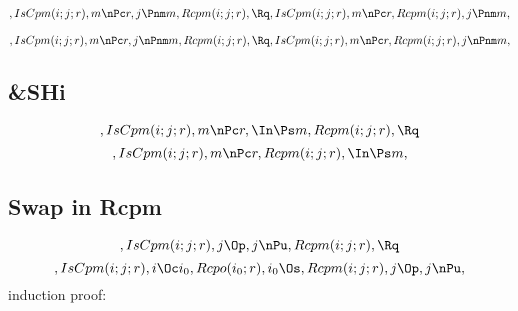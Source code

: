 \[, IsCpm(i;j;r), m \nPc r, j \Pnm m, Rcpm(i;j;r), \Rq , IsCpm(i;j;r), m \nPc r, Rcpm(i;j;r), j \Pnm m,\]

\[, IsCpm(i;j;r), m \nPc r, j \nPnm m, Rcpm(i;j;r), \Rq , IsCpm(i;j;r), m \nPc r, Rcpm(i;j;r), j \nPnm m,\]



\bigskip
\bigskip
\subsection{\&SHi}
\[, IsCpm(i;j;r), m \nPc r, \In \Ps m, Rcpm(i;j;r), \Rq \]
\[, IsCpm(i;j;r), m \nPc r, Rcpm(i;j;r), \In \Ps m, \]



\bigskip
\bigskip
\subsection{ Swap in Rcpm}
\[, IsCpm(i;j;r), j \Op, j \nPu, Rcpm(i;j;r), \Rq \]
\[, IsCpm(i;j;r), i \Oc i_0, Rcpo(i_0;r), i_0 \Os, Rcpm(i;j;r), j \Op, j \nPu, \]
induction \; proof:\\
